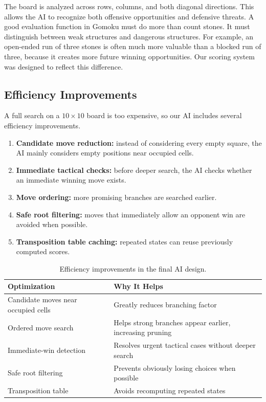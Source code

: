 \documentclass[11pt]{article}
\begin{document}
The board is analyzed across rows, columns, and both diagonal directions. This allows the AI to recognize both offensive opportunities and defensive threats. A good evaluation function in Gomoku must do more than count stones. It must distinguish between weak structures and dangerous structures. For example, an open-ended run of three stones is often much more valuable than a blocked run of three, because it creates more future winning opportunities. Our scoring system was designed to reflect this difference.

\subsection*{Efficiency Improvements}

A full search on a \(10 \times 10\) board is too expensive, so our AI includes several efficiency improvements.

\begin{enumerate}
    \item \textbf{Candidate move reduction:} instead of considering every empty square, the AI mainly considers empty positions near occupied cells.
    \item \textbf{Immediate tactical checks:} before deeper search, the AI checks whether an immediate winning move exists.
    \item \textbf{Move ordering:} more promising branches are searched earlier.
    \item \textbf{Safe root filtering:} moves that immediately allow an opponent win are avoided when possible.
    \item \textbf{Transposition table caching:} repeated states can reuse previously computed scores.
\end{enumerate}

\begin{table}[H]
\centering
\small
\begin{tabularx}{\textwidth}{|P{4.0cm}|Y|}
\hline
\textbf{Optimization} & \textbf{Why It Helps} \\
\hline
Candidate moves near occupied cells & Greatly reduces branching factor \\
\hline
Ordered move search & Helps strong branches appear earlier, increasing pruning \\
\hline
Immediate-win detection & Resolves urgent tactical cases without deeper search \\
\hline
Safe root filtering & Prevents obviously losing choices when possible \\
\hline
Transposition table & Avoids recomputing repeated states \\
\hline
\end{tabularx}
\caption{Efficiency improvements in the final AI design.}
\end{table}
\end{document}
